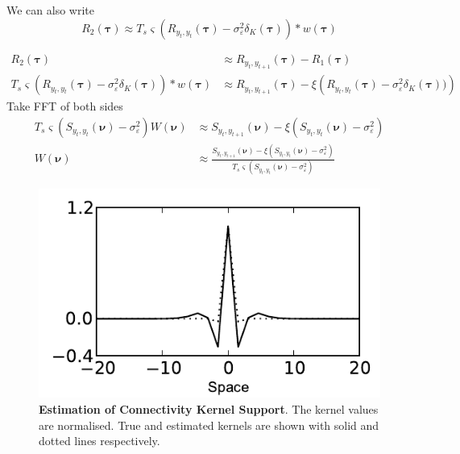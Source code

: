 \documentclass[]{article}
\begin{document}
We can also write
\begin{equation}
	R_2(\boldsymbol{\tau}) \approx T_s \varsigma (R_{y_{t},y_{t}}(\boldsymbol{\tau}) - \sigma_{\varepsilon}^2\delta_K\left(\boldsymbol{\tau}\right)) \ast w(\boldsymbol{\tau})  
\end{equation}


\begin{align}
	R_2(\boldsymbol{\tau}) &\approx R_{y_{t},y_{t+1}}(\boldsymbol{\tau}) - R_1(\boldsymbol{\tau}) \\
	T_s \varsigma (R_{y_{t},y_{t}}(\boldsymbol{\tau}) - \sigma_{\varepsilon}^2\delta_K\left(\boldsymbol{\tau}\right)) \ast w\left(\boldsymbol{\tau}\right) &\approx R_{y_{t},y_{t+1}}(\boldsymbol{\tau}) - \xi\left( R_{y_{t},y_{t}}(\boldsymbol{\tau}) - \sigma_{\varepsilon}^2\delta_K\left(\boldsymbol{\tau}\right))  \right)
\end{align}
Take FFT of both sides
\begin{align}
	T_s \varsigma (S_{y_{t},y_{t}}\left(\boldsymbol{\nu}\right) - \sigma_{\varepsilon}^2) W\left(\boldsymbol{\nu}\right) &\approx S_{y_{t},y_{t+1}}\left(\boldsymbol{\nu}\right) - \xi (S_{y_{t},y_{t}}\left(\boldsymbol{\nu}\right) - \sigma_{\varepsilon}^2) \\
	W\left(\boldsymbol{\nu}\right) &\approx \frac{S_{y_{t},y_{t+1}}\left(\boldsymbol{\nu}\right) - \xi (S_{y_{t},y_{t}}\left(\boldsymbol{\nu}\right) - \sigma_{\varepsilon}^2)}{T_s \varsigma (S_{y_{t},y_{t}}\left(\boldsymbol{\nu}\right) - \sigma_{\varepsilon}^2)}
\end{align}

\begin{figure}[!ht]
\begin{center}
\includegraphics{./Figures/KernelWidthEstimation.pdf}
\end{center}
\caption{{\bf Estimation of Connectivity Kernel Support}. The kernel values are normalised. True  and estimated kernels are shown with solid and dotted lines respectively.}
\label{fig:KernelWidth}
\end{figure}
\end{document}
